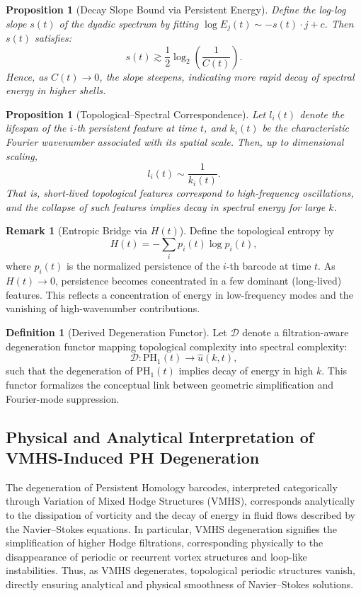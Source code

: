\documentclass[11pt]{article}
\newtheorem{proposition}[theorem]{Proposition}
\theoremstyle{definition}
\newtheorem{definition}[theorem]{Definition}
\newtheorem{remark}[theorem]{Remark}
\begin{document}
\begin{proposition}[Decay Slope Bound via Persistent Energy]
Define the log-log slope $s(t)$ of the dyadic spectrum by fitting $\log E_j(t) \sim -s(t) \cdot j + c$. Then $s(t)$ satisfies:
\[
s(t) \gtrsim \frac{1}{2} \log_2 \left(\frac{1}{C(t)}\right).
\]
Hence, as $C(t) \to 0$, the slope steepens, indicating more rapid decay of spectral energy in higher shells.
\end{proposition}

\begin{proposition}[Topological--Spectral Correspondence]
Let $l_i(t)$ denote the lifespan of the $i$-th persistent feature at time $t$, and $k_i(t)$ be the characteristic Fourier wavenumber associated with its spatial scale. Then, up to dimensional scaling,
\[
l_i(t) \sim \frac{1}{k_i(t)}.
\]
That is, short-lived topological features correspond to high-frequency oscillations, and the collapse of such features implies decay in spectral energy for large $k$.
\end{proposition}

\begin{remark}[Entropic Bridge via $H(t)$]
Define the topological entropy by
\[
H(t) = -\sum_i p_i(t) \log p_i(t),
\]
where $p_i(t)$ is the normalized persistence of the $i$-th barcode at time $t$. As $H(t) \to 0$, persistence becomes concentrated in a few dominant (long-lived) features. This reflects a concentration of energy in low-frequency modes and the vanishing of high-wavenumber contributions.
\end{remark}

\begin{definition}[Derived Degeneration Functor]
Let $\mathcal{D}$ denote a filtration-aware degeneration functor mapping topological complexity into spectral complexity:
\[
\mathcal{D} : \mathrm{PH}_1(t) \longrightarrow \widehat{u}(k, t),
\]
such that the degeneration of $\mathrm{PH}_1(t)$ implies decay of energy in high $k$. This functor formalizes the conceptual link between geometric simplification and Fourier-mode suppression.
\end{definition}

\subsection{Physical and Analytical Interpretation of VMHS-Induced PH Degeneration}

The degeneration of Persistent Homology barcodes, interpreted categorically through Variation of Mixed Hodge Structures (VMHS), corresponds analytically to the dissipation of vorticity and the decay of energy in fluid flows described by the Navier–Stokes equations. In particular, VMHS degeneration signifies the simplification of higher Hodge filtrations, corresponding physically to the disappearance of periodic or recurrent vortex structures and loop-like instabilities. Thus, as VMHS degenerates, topological periodic structures vanish, directly ensuring analytical and physical smoothness of Navier–Stokes solutions.
\end{document}
